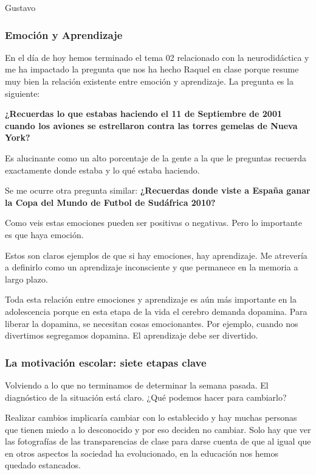 \begin{opin}{\guscolor}{Gustavo}

\subsubsection{Emoción y Aprendizaje}

En el día de hoy hemos terminado el tema 02 relacionado con la neurodidáctica y me ha impactado la pregunta que nos ha hecho Raquel en clase porque resume muy bien la relación existente entre emoción y aprendizaje. La pregunta es la siguiente:

\textbf{¿Recuerdas lo que estabas haciendo el 11 de Septiembre de 2001 cuando los aviones se estrellaron contra las torres gemelas de Nueva York?}

Es alucinante como un alto porcentaje de la gente a la que le preguntas recuerda exactamente donde estaba y lo qué estaba haciendo.

Se me ocurre otra pregunta similar: \textbf{¿Recuerdas donde viste a España ganar la Copa del Mundo de Futbol de Sudáfrica 2010?}

Como veis estas emociones pueden ser positivas o negativas. Pero lo importante es que haya emoción.

Estos son claros ejemplos de que si hay emociones, hay aprendizaje. Me atrevería a definirlo como un aprendizaje inconsciente y que permanece en la memoria a largo plazo.

Toda esta relación entre emociones y aprendizaje es aún más importante en la adolescencia porque en esta etapa de la vida el cerebro demanda dopamina. Para liberar la dopamina, se necesitan cosas emocionantes. Por ejemplo, cuando nos divertimos segregamos dopamina. El aprendizaje debe ser divertido. 

\subsubsection{La motivación escolar: siete etapas clave}

Volviendo a lo que no terminamos de determinar la semana pasada. El diagnóstico de la situación está claro. ¿Qué podemos hacer para cambiarlo?

Realizar cambios implicaría cambiar con lo establecido y hay muchas personas que tienen miedo a lo desconocido y por eso deciden no cambiar. Solo hay que ver las fotografías de las transparencias de clase para darse cuenta de que al igual que en otros aspectos la sociedad ha evolucionado, en la educación nos hemos quedado estancados.


\end{opin}
